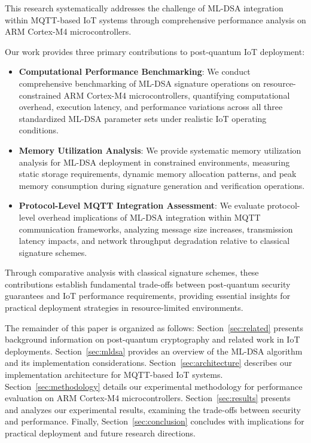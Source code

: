 \documentclass[journal=tches,final]{iacrtrans}
\begin{document}
This research systematically addresses the challenge of ML-DSA integration within MQTT-based IoT systems through comprehensive performance analysis on ARM Cortex-M4 microcontrollers. {\color{blue}Our work provides three primary contributions to post-quantum IoT deployment:

\begin{itemize}
\item \textbf{Computational Performance Benchmarking}: We conduct comprehensive benchmarking of ML-DSA signature operations on resource-constrained ARM Cortex-M4 microcontrollers, quantifying computational overhead, execution latency, and performance variations across all three standardized ML-DSA parameter sets under realistic IoT operating conditions.

\item \textbf{Memory Utilization Analysis}: We provide systematic memory utilization analysis for ML-DSA deployment in constrained environments, measuring static storage requirements, dynamic memory allocation patterns, and peak memory consumption during signature generation and verification operations.

\item \textbf{Protocol-Level MQTT Integration Assessment}: We evaluate protocol-level overhead implications of ML-DSA integration within MQTT communication frameworks, analyzing message size increases, transmission latency impacts, and network throughput degradation relative to classical signature schemes.
\end{itemize}

Through comparative analysis with classical signature schemes, these contributions establish fundamental trade-offs between post-quantum security guarantees and IoT performance requirements, providing essential insights for practical deployment strategies in resource-limited environments.}

The remainder of this paper is organized as follows: Section~\ref{sec:related} presents background information on post-quantum cryptography and related work in IoT deployments. Section~\ref{sec:mldsa} provides an overview of the ML-DSA algorithm and its implementation considerations. Section~\ref{sec:architecture} describes our implementation architecture for MQTT-based IoT systems. Section~\ref{sec:methodology} details our experimental methodology for performance evaluation on ARM Cortex-M4 microcontrollers. Section~\ref{sec:results} presents and analyzes our experimental results, examining the trade-offs between security and performance. Finally, Section~\ref{sec:conclusion} concludes with implications for practical deployment and future research directions.
\end{document}
